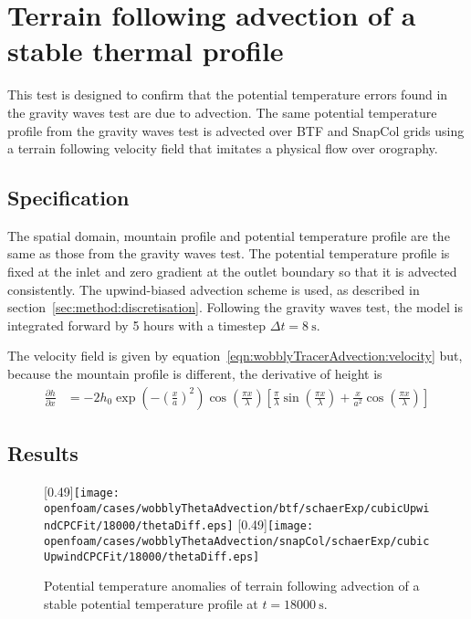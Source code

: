\section{Terrain following advection of a stable thermal profile}
\label{sec:wobblyThetaAdvection}

This test is designed to confirm that the potential temperature errors found in the gravity waves test are due to advection.  The same potential temperature profile from the gravity waves test is advected over BTF and SnapCol grids using a terrain following velocity field that imitates a physical flow over orography.

\subsection{Specification}
The spatial domain, mountain profile and potential temperature profile are the same as those from the gravity waves test.  The potential temperature profile is fixed at the inlet and zero gradient at the outlet boundary so that it is advected consistently.  The upwind-biased advection scheme is used, as described in section~\ref{sec:method:discretisation}.  Following the gravity waves test, the model is integrated forward by 5 hours with a timestep $\Delta t = \SI{8}{\second}$. 

The velocity field is given by equation~\ref{eqn:wobblyTracerAdvection:velocity} but, because the mountain profile is different, the derivative of height is
\begin{align}
\frac{\partial h}{\partial x} &= - 2 h_0 \exp \left( - \left( \frac{x}{a} \right)^2 \right) \cos \left( \frac{\pi x}{\lambda} \right) \left[
\frac{\pi}{\lambda} \sin \left(\frac{\pi x}{\lambda} \right) +
\frac{x}{a^2} \cos \left( \frac{\pi x}{\lambda} \right) \right]
\end{align}

\subsection{Results}


\begin{figure}
	\captionsetup[subfigure]{position=b}
	\centering
	[0.49\textwidth]{\texttt{[image: openfoam/cases/wobblyThetaAdvection/btf/schaerExp/cubicUpwindCPCFit/18000/thetaDiff.eps]}}
	\hfill
	[0.49\textwidth]{\texttt{[image: openfoam/cases/wobblyThetaAdvection/snapCol/schaerExp/cubicUpwindCPCFit/18000/thetaDiff.eps]}}
%
	\caption{Potential temperature anomalies of terrain following advection of a stable potential temperature profile at $t = \SI{18000}{\second}$. }
	\label{fig:wobblyThetaAdvection:thetaDiff}
\end{figure}
